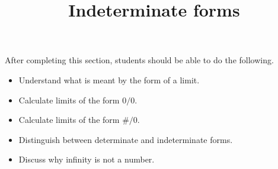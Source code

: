 \documentclass{ximera}
\title{Indeterminate forms}
\begin{document}
\begin{abstract}
\end{abstract}

\maketitle

\begin{sectionOutcomes}

After completing this section, students should be able to do the following.

\begin{itemize}
\item Understand what is meant by the form of a limit.
\item Calculate limits of the form $0/0$.
\item Calculate limits of the form $\#/0$.
\item Distinguish between determinate and indeterminate forms.
\item Discuss why infinity is not a number.
\end{itemize}
\end{sectionOutcomes}
\end{document}
